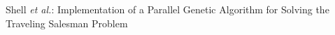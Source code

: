 \documentclass[10pt,journal,compsoc]{IEEEtran}
\begin{document}
%
{Shell \MakeLowercase{\textit{et al.}}: Implementation of a Parallel Genetic Algorithm for Solving the Traveling Salesman Problem}
% 






\end{document}
